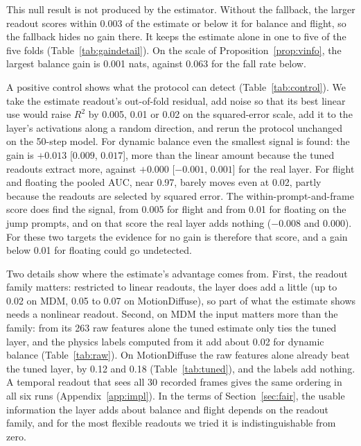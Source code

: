 This null result is not produced by the estimator. Without the fallback, the larger readout scores within 0.003 of the estimate or below it for balance and flight, so the fallback hides no gain there. It keeps the estimate alone in one to five of the five folds (Table~\ref{tab:gaindetail}). On the scale of Proposition~\ref{prop:vinfo}, the largest balance gain is 0.001 nats, against 0.063 for the fall rate below.

A positive control shows what the protocol can detect (Table~\ref{tab:control}). We take the estimate readout's out-of-fold residual, add noise so that its best linear use would raise $R^2$ by 0.005, 0.01 or 0.02 on the squared-error scale, add it to the layer's activations along a random direction, and rerun the protocol unchanged on the 50-step model. For dynamic balance even the smallest signal is found: the gain is $+0.013$ [$0.009$, $0.017$], more than the linear amount because the tuned readouts extract more, against $+0.000$ [$-0.001$, $0.001$] for the real layer. For flight and floating the pooled AUC, near 0.97, barely moves even at 0.02, partly because the readouts are selected by squared error. The within-prompt-and-frame score does find the signal, from 0.005 for flight and from 0.01 for floating on the jump prompts, and on that score the real layer adds nothing ($-0.008$ and $0.000$). For these two targets the evidence for no gain is therefore that score, and a gain below 0.01 for floating could go undetected.

Two details show where the estimate's advantage comes from. First, the readout family matters: restricted to linear readouts, the layer does add a little (up to 0.02 on MDM, 0.05 to 0.07 on MotionDiffuse), so part of what the estimate shows needs a nonlinear readout. Second, on MDM the input matters more than the family: from its 263 raw features alone the tuned estimate only ties the tuned layer, and the physics labels computed from it add about 0.02 for dynamic balance (Table~\ref{tab:raw}). On MotionDiffuse the raw features alone already beat the tuned layer, by 0.12 and 0.18 (Table~\ref{tab:tuned}), and the labels add nothing. A temporal readout that sees all 30 recorded frames gives the same ordering in all six runs (Appendix~\ref{app:impl}). In the terms of Section~\ref{sec:fair}, the usable information the layer adds about balance and flight depends on the readout family, and for the most flexible readouts we tried it is indistinguishable from zero.

